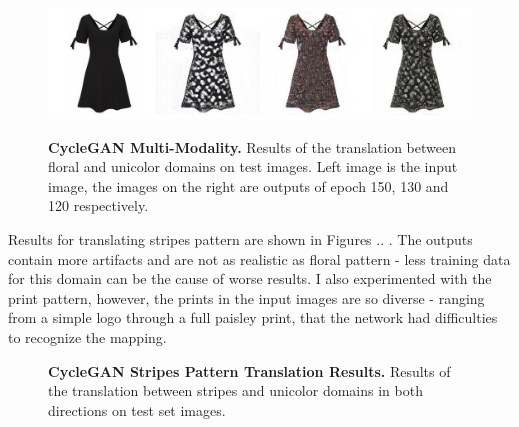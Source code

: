 \documentclass[12pt]{report}
\begin{document}
\begin{figure}[h]
\centering
{\includegraphics[width=\linewidth]{04_experiments/cyclegan/floral_multimodal}}
\caption{\label{fig:cycle_floral_multimodal} \textbf{CycleGAN Multi-Modality.} Results of the translation between floral and unicolor domains on test images. Left image is the input image, the images on the right are outputs of epoch 150, 130 and 120 respectively.}
\end{figure}

Results for translating stripes pattern are shown in Figures .. . The outputs contain more artifacts and are not as realistic as floral pattern - less training data for this domain can be the cause of worse results. I also experimented with the print pattern, however, the prints in the input images are so diverse - ranging from a simple logo through a full paisley print, that the network had difficulties to recognize the mapping.

\begin{figure}[h]
\centering
{}
\caption{\label{fig:cycle_stripes_results} \textbf{CycleGAN Stripes Pattern Translation Results.} Results of the translation between stripes and unicolor domains in both directions on test set images.}
\end{figure}
\end{document}
